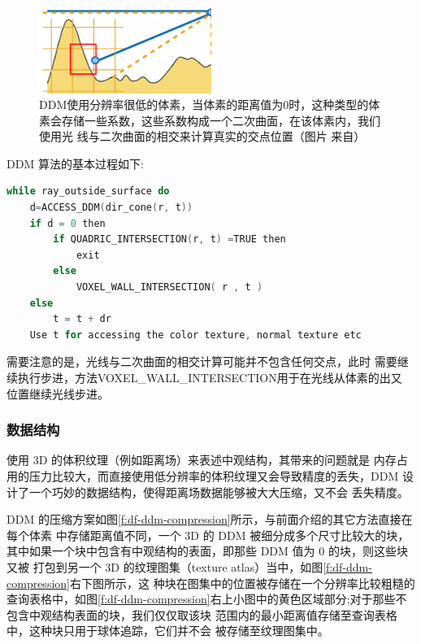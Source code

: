 \begin{figure}
\sidecaption
	\includegraphics[width=0.5\textwidth]{figures/df/ddm-2}
	\caption{DDM使用分辨率很低的体素，当体素的距离值为0时，这种类型的体素会存储一些系数，这些系数构成一个二次曲面，在该体素内，我们使用光 线与二次曲面的相交来计算真实的交点位置（图片 来自\cite{a:directional-distance-maps}）}
	\label{f:df-ddm-2}
\end{figure}

DDM 算法的基本过程如下:

\begin{lstlisting}[language=C++, mathescape=true]
while ray_outside_surface do
	d=ACCESS_DDM(dir_cone(r, t))
	if d = 0 then
		if QUADRIC_INTERSECTION(r, t) =TRUE then
			exit
		else
			VOXEL_WALL_INTERSECTION( r , t )
	else
		t = t + dr
	Use t for accessing the color texture, normal texture etc
\end{lstlisting}

需要注意的是，光线与二次曲面的相交计算可能并不包含任何交点，此时 需要继续执行步进，方法VOXEL\_WALL\_INTERSECTION用于在光线从体素的出又 位置继续光线步进。



\subsubsection{数据结构}
使用 3D 的体积纹理（例如距离场）来表述中观结构，其带来的问题就是 内存占用的压力比较大，而直接使用低分辨率的体积纹理又会导致精度的丢失，DDM 设计了一个巧妙的数据结构，使得距离场数据能够被大大压缩，又不会 丢失精度。

DDM 的压缩方案如图\ref{f:df-ddm-compression}所示，与前面介绍的其它方法直接在每个体素 中存储距离值不同，一个 3D 的 DDM 被细分成多个尺寸比较大的块，其中如果一个块中包含有中观结构的表面，即那些 DDM 值为 0 的块，则这些块又被 打包到另一个 3D 的纹理图集（texture atlas）当中，如图\ref{f:df-ddm-compression}右下图所示，这 种块在图集中的位置被存储在一个分辨率比较粗糙的查询表格中，如图\ref{f:df-ddm-compression}右上小图中的黄色区域部分;对于那些不包含中观结构表面的块，我们仅仅取该块 范围内的最小距离值存储至查询表格中，这种块只用于球体追踪，它们并不会 被存储至纹理图集中。

